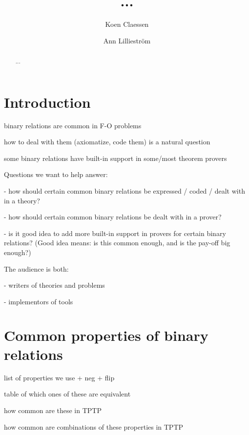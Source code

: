 \documentclass{easychair}
\title{...}
\author{
  Koen Claessen
  \and 
  Ann Lilliestr{\"o}m
}
\institute{
  Chalmers University of Technology
  \email{\{koen,annl\}@chalmers.se}
}
\begin{document}
\maketitle


\begin{abstract}
...
\end{abstract}


\section{Introduction}

binary relations are common in F-O problems

how to deal with them (axiomatize, code them) is a natural question

some binary relations have built-in support in some/most theorem provers

Questions we want to help answer:

- how should certain common binary relations be expressed / coded / dealt with in a theory?

- how should certain common binary relations be dealt with in a prover?

- is it good idea to add more built-in support in provers for certain binary relations? (Good idea means: is this common enough, and is the pay-off big enough?)

The audience is both:

- writers of theories and problems

- implementors of tools


\section{Common properties of binary relations}

list of properties we use + neg + flip

table of which ones of these are equivalent

how common are these in TPTP

how common are combinations of these properties in TPTP
\end{document}
